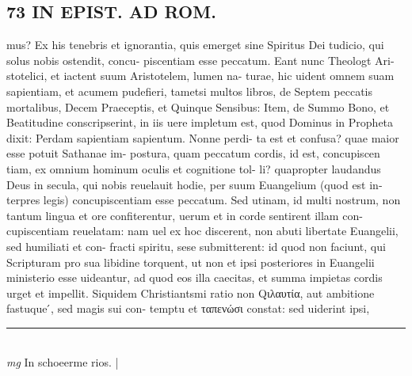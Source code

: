 \documentclass{article}
\begin{document}
\begin{pages}
\section*{73 IN EPIST. AD ROM.  }
\marginpar{[ p.]}\pstart mus? Ex his tenebris et ignorantia, quis emerget sine Spiritus Dei tudicio, qui solus nobis ostendit, concu- piscentiam esse peccatum. Eant nunc Theologt Ari- stotelici, et iactent suum Aristotelem, lumen na- turae, hic uident omnem suam sapientiam, et acumem pudefieri, tametsi multos libros, de Septem peccatis mortalibus, Decem Praeceptis, et Quinque Sensibus: Item, de Summo Bono, et Beatitudine conscripserint, in iis uere impletum est, quod Dominus in Propheta dixit: Perdam sapientiam sapientum. Nonne perdi- ta est et confusa? quae maior esse potuit Sathanae im- postura, quam peccatum cordis, id est, concupiscen tiam, ex omnium hominum oculis et cognitione tol- li? quapropter laudandus Deus in secula, qui nobis reuelauit hodie, per suum Euangelium (quod est in- terpres legis) concupiscentiam esse peccatum. Sed utinam, id multi nostrum, non tantum lingua et ore confiterentur, uerum et in corde sentirent illam con- cupiscentiam reuelatam: nam uel ex hoc discerent, non abuti libertate Euangelii, sed humiliati et con- fracti spiritu, sese submitterent: id quod non faciunt, qui Scripturam pro sua libidine torquent, ut non et ipsi posteriores in Euangelii ministerio esse uideantur, ad quod eos illa caecitas, et summa impietas cordis urget et impellit. Siquidem Christiantsmi ratio non Qιλαυτία, aut ambitione fastuque ́, sed magis sui con- temptu et ταπενώσι constat: sed uiderint ipsi,  \pend
\vspace{0.5cm}\noindent
\vspace{0.2cm}\rule{1cm}{0.2pt}\\ 
\hspace{0.2cm}\textit{mg}
\footnotesize In schoeerme rios.  
\normalsize| 

\end{pages}
\end{document}
